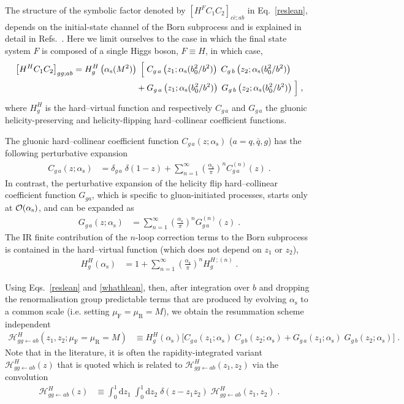 \documentclass[12pt]{article}
\DeclareRobustCommand{\nn}{\nonumber}
\DeclareRobustCommand{\alphas}{\ensuremath{\alpha_{\mathrm{s}}}\xspace}
\DeclareRobustCommand{\as}{\alphas}
\DeclareRobustCommand{\asOpi}{\ensuremath{\left(\frac{\as}{\pi}\right)}} %
\DeclareRobustCommand{\mur}{\ensuremath{\mu_{\mathrm{R}}}\xspace}
\DeclareRobustCommand{\muR}{\mur}
\DeclareRobustCommand{\muf}{\ensuremath{\mu_{\mathrm{F}}}\xspace}
\DeclareRobustCommand{\muF}{\muf}
\DeclareRobustCommand{\rd}{\ensuremath{\mathrm{d}}}
\DeclareRobustCommand{\cH}{\ensuremath{\mathcal{H}}}
\begin{document}
The structure of the symbolic factor denoted by $\left[ H^{F} C_1 C_2 \right]_{c\bar{c};a b}$ in Eq.~\eqref{reslean}, depends on the initial-state channel of the Born subprocess and is explained in detail in Refs.~\cite{Catani:2010pd,Catani:2013tia}. Here we limit ourselves to the case in which the final state system $F$ is composed of a single Higgs boson, $F\equiv H$, in which case,
\begin{align}
  \left[ H^{H} C_1 C_2 \right]_{gg;ab}
  = 
  H_{g}^{H}\left(\as(M^2)\right) \; \Bigl[ \; &
    C_{g \,a}\left(z_1;\as(b_0^2/b^2)\right) \; 
    C_{g \,b}\left(z_2;\as(b_0^2/b^2)\right) 
    \nn\\
    {}+{} & 
    G_{g \,a}\left(z_1;\as(b_0^2/b^2)\right) \; 
    G_{g \,b}\left(z_2;\as(b_0^2/b^2)\right)
  \;\Bigr]
  \;,
  \label{whathlean}
\end{align}
where $H_{g}^{H}$ is the hard--virtual function and respectively $C_{g \,a}$ and $G_{g \,a}$ the gluonic helicity-preserving and helicity-flipping hard--collinear coefficient functions.

The gluonic hard--collinear coefficient function $C_{g \,a}(z;\as)$ ($a=q,{\bar q},g$) has the following perturbative expansion
\begin{align}
  C_{g \,a}(z;\as) &= 
  \delta_{g \,a} \; \delta(1-z) + 
  \sum_{n=1}^\infty \asOpi^n C_{g\, a}^{(n)}(z) \;.
  \label{cgexp} 
\end{align}
In contrast, the perturbative expansion of the helicity flip hard--collinear coefficient function $G_{ga}$, which is specific to gluon-initiated processes, starts only at ${\cal O}(\as)$, and can be expanded as~\cite{Catani:2010pd,Catani:2013tia}
\begin{align}
  G_{g \,a}(z;\as) &=
  \sum_{n=1}^\infty \asOpi^n G_{g \,a}^{(n)}(z) \;.
  \label{gfexp}
\end{align}
The IR finite contribution of the $n$-loop correction terms to the Born subprocess is contained in the hard--virtual function (which does not depend on $z_1$ or $z_2$),
\begin{align}
  H_g^{H}(\as) &= 
  1+ \sum_{n=1}^\infty \asOpi^n H_g^{H \,;(n)} \;.
  \label{hexp}
\end{align} 

Using Eqs.~\eqref{reslean} and \eqref{whathlean}, then, after integration over $b$ and dropping the renormalisation group predictable terms that are produced by evolving $\as$ to a common scale (i.e. setting $\muF=\muR=M$), we obtain the resummation scheme independent
\begin{align}
  \cH^H_{gg\gets ab}(z_1,z_2; \muf=\mur=M)
  &\equiv 
  H_g^H(\as) \Big[ 
    C_{g \,a}(z_1;\as) \; C_{g \,b}(z_2;\as) +
    G_{g \,a}(z_1;\as) \; G_{g \,b}(z_2;\as)
  \Big] \; .
  \label{HCCGG}
\end{align}
Note that in the literature, it is often the rapidity-integrated variant $\cH^H_{gg\gets ab}(z)$ that is quoted which is related to $\cH^H_{gg\gets ab}(z_1,z_2)$ via the convolution
\begin{align}
  \cH^H_{gg\gets ab}(z)
  &\equiv
  \int_0^1\rd z_1 \; \int_0^1\rd z_2 \; \delta(z-z_1 z_2) \; \cH^H_{gg\gets ab}(z_1,z_2) \;.
\end{align}
\end{document}
